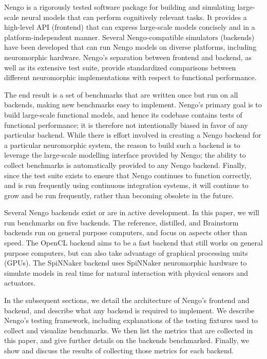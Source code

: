 \documentclass{frontiersSCNS}
\begin{document}
Nengo is a rigorously tested software package
for building and simulating
large-scale neural models
that can perform cognitively relevant tasks.
It provides a high-level API (frontend)
that can express large-scale models concisely
and in a platform-independent manner.
Several Nengo-compatible simulators (backends)
have been developed that can
run Nengo models on diverse platforms,
including neuromorphic hardware.
Nengo's separation between frontend and backend,
as well as its extensive test suite,
provide standardized comparisons
between different neuromorphic implementations
with respect to functional performance.

The end result is a set of benchmarks that
are written once but run on all backends,
making new benchmarks easy to implement.
Nengo's primary goal is to
build large-scale functional models,
and hence its codebase contains
tests of functional performance;
it is therefore not intentionally
biased in favor of any particular backend.
While there is effort involved in creating
a Nengo backend for a particular neuromorphic system,
the reason to build such a backend
is to leverage the large-scale modelling interface
provided by Nengo;
the ability to collect benchmarks
is automatically provided to any Nengo backend.
Finally, since the test suite exists
to ensure that Nengo continues to function
correctly, and is run frequently using
continuous integration systems,
it will continue to grow and be run frequently,
rather than becoming obsolete in the future.

Several Nengo backends exist or are in active development.
In this paper, we will run benchmarks
on five backends.
The reference, distilled, and Brainstorm backends
run on general purpose computers,
and focus on aspects other than speed.
The OpenCL backend aims to be a fast backend
that still works on general purpose computers,
but can also take advantage of
graphical processing units (GPUs).
The SpiNNaker backend uses
SpiNNaker neuromorphic hardware to
simulate models in real time
for natural interaction with
physical sensors and actuators.

In the subsequent sections,
we detail the architecture of Nengo's
frontend and backend,
and describe what any backend
is required to implement.
We describe Nengo's testing framework,
including explanations of the testing fixtures
used to collect and visualize benchmarks.
We then list the metrics
that are collected in this paper,
and give further details on the backends benchmarked.
Finally, we show and discuss
the results of collecting those metrics
for each backend.
\end{document}
